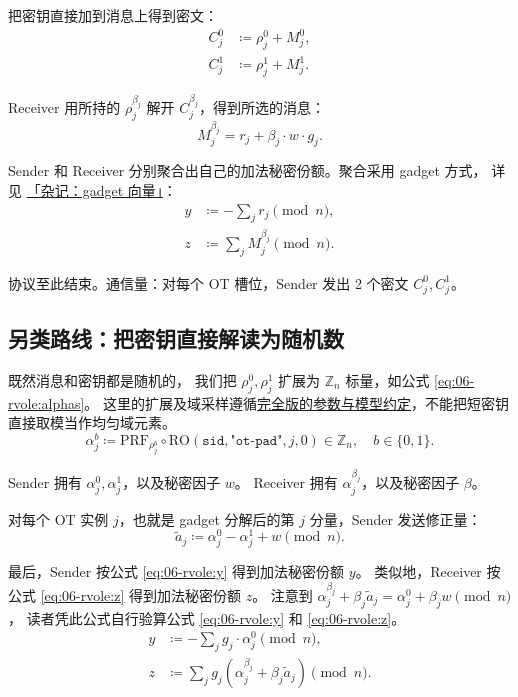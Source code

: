 把密钥直接加到消息上得到密文：
\begin{align}C^0_j & \coloneq \rho^0_j + M^0_j, \\
             C^1_j & \coloneq \rho^1_j + M^1_j.
\end{align}

Receiver 用所持的 $\rho^{\beta_j}_j$ 解开 $C^{\beta_j}_j$，得到所选的消息：
\begin{equation}\label{eq:06-rvole:1}
  M^{\beta_j}_j = r_j + \beta_j\cdot w\cdot g_j.
\end{equation}

Sender 和 Receiver 分别聚合出自己的加法秘密份额。聚合采用 gadget 方式，
详见 \hyperref[sec:gadget-vector]{「杂记：gadget 向量」}：
\begin{align}y & \coloneq -\sum_j  r_j \pmod{n},         \\
             z & \coloneq \sum_j M^{\beta_j}_j \pmod{n}.
\end{align}

协议至此结束。通信量：对每个 OT 槽位，Sender 发出 2 个密文 $C^0_j, C^1_j$。

\subsection{另类路线：把密钥直接解读为随机数}

既然消息和密钥都是随机的，
我们把 $\rho_j^0, \rho_j^1$ 扩展为 $\mathbb{Z}_n$ 标量，如公式 \eqref{eq:06-rvole:alphas}。
这里的扩展及域采样遵循\hyperref[sec:rvole:parameters-model]{完全版的参数与模型约定}，不能把短密钥直接取模当作均匀域元素。
\begin{equation}\label{eq:06-rvole:alphas}
  \alpha_j^b \coloneq \mathrm{PRF}_{\rho_j^b}
  \circ \mathrm{RO}(\mathtt{sid},\texttt{"ot-pad"},j,0)
  \in \mathbb Z_n,\quad b\in\{0,1\}.
\end{equation}

Sender 拥有 $\alpha_j^0,\alpha_j^1$，以及秘密因子 $w$。
Receiver 拥有 $\alpha_j^{\beta_j}$，以及秘密因子 $\beta$。

对每个 OT 实例 $j$，也就是 gadget 分解后的第 $j$ 分量，Sender 发送修正量：
\begin{equation}\label{eq:06-rvole:3}
  \tilde a_j \coloneq \alpha^0_j - \alpha^1_j + w \pmod{n}.
\end{equation}

最后，Sender 按公式 \eqref{eq:06-rvole:y} 得到加法秘密份额 $y$。
类似地，Receiver 按公式 \eqref{eq:06-rvole:z} 得到加法秘密份额 $z$。
注意到 $\alpha^{\beta_j}_j + \beta_j\tilde a_j = \alpha^0_j + \beta_j w \pmod n$，
读者凭此公式自行验算公式 \eqref{eq:06-rvole:y} 和 \eqref{eq:06-rvole:z}。
\begin{align}\label{eq:06-rvole:y}
  y & \coloneq -\sum_j g_j\cdot\alpha^0_j \pmod{n},                                    \\
  \label{eq:06-rvole:z}
  z & \coloneq \sum_j g_j\left(\alpha^{\beta_j}_j + \beta_j\tilde a_j\right) \pmod{n}.
\end{align}


